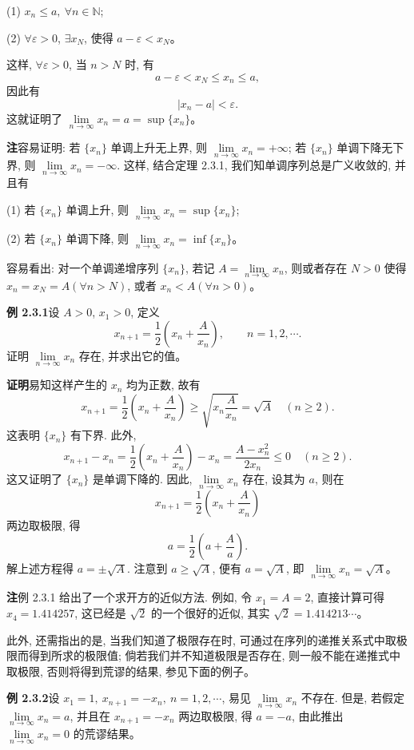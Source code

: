 \documentclass[UTF8, 12pt, fontset=fandol, oneside]{ctexart}
\begin{document}
(1) $x_n\leqslant a,\ \forall n\in\mathbb{N}$;

(2) $\forall\varepsilon>0$, $\exists x_N$, 使得 $a-\varepsilon<x_N$。

这样, $\forall\varepsilon>0$, 当 $n>N$ 时, 有
\[
  a-\varepsilon<x_N\leqslant x_n\leqslant a,
\]
因此有
\[
  |x_n-a|<\varepsilon.
\]
这就证明了 $\lim\limits_{n\to\infty}x_n=a=\sup\{x_n\}$。

\noindent\textbf{注}\quad 容易证明: 若 $\{x_n\}$ 单调上升无上界, 则 $\lim\limits_{n\to\infty}x_n=+\infty$; 若 $\{x_n\}$ 单调下降无下界, 则 $\lim\limits_{n\to\infty}x_n=-\infty$. 这样, 结合定理 2.3.1, 我们知单调序列总是广义收敛的, 并且有

(1) 若 $\{x_n\}$ 单调上升, 则 $\lim\limits_{n\to\infty}x_n=\sup\{x_n\}$;

(2) 若 $\{x_n\}$ 单调下降, 则 $\lim\limits_{n\to\infty}x_n=\inf\{x_n\}$。

容易看出: 对一个单调递增序列 $\{x_n\}$, 若记 $A=\lim\limits_{n\to\infty}x_n$, 则或者存在 $N>0$ 使得 $x_n=x_N=A(\forall n>N)$, 或者 $x_n<A(\forall n>0)$。

\noindent\textbf{例 2.3.1}\quad 设 $A>0$, $x_1>0$, 定义
\[
  x_{n+1}=\frac12\left(x_n+\frac A{x_n}\right),\qquad n=1,2,\cdots.
\]
证明 $\lim\limits_{n\to\infty}x_n$ 存在, 并求出它的值。

\noindent\textbf{证明}\quad 易知这样产生的 $x_n$ 均为正数, 故有
\[
  x_{n+1}=\frac12\left(x_n+\frac A{x_n}\right)
  \geqslant \sqrt{x_n\frac A{x_n}}=\sqrt A
  \quad(n\geqslant2).
\]
这表明 $\{x_n\}$ 有下界. 此外,
\[
  x_{n+1}-x_n
  =
  \frac12\left(x_n+\frac A{x_n}\right)-x_n
  =
  \frac{A-x_n^2}{2x_n}\leqslant0
  \quad(n\geqslant2).
\]
这又证明了 $\{x_n\}$ 是单调下降的. 因此, $\lim\limits_{n\to\infty}x_n$ 存在, 设其为 $a$, 则在
\[
  x_{n+1}=\frac12\left(x_n+\frac A{x_n}\right)
\]
两边取极限, 得
\[
  a=\frac12\left(a+\frac Aa\right).
\]
解上述方程得 $a=\pm\sqrt A$. 注意到 $a\geqslant\sqrt A$, 便有 $a=\sqrt A$, 即 $\lim\limits_{n\to\infty}x_n=\sqrt A$。

\noindent\textbf{注}\quad 例 2.3.1 给出了一个求开方的近似方法. 例如, 令 $x_1=A=2$, 直接计算可得 $x_4=1.414257$, 这已经是 $\sqrt2$ 的一个很好的近似, 其实 $\sqrt2=1.414213\cdots$。

此外, 还需指出的是, 当我们知道了极限存在时, 可通过在序列的递推关系式中取极限而得到所求的极限值; 倘若我们并不知道极限是否存在, 则一般不能在递推式中取极限, 否则将得到荒谬的结果, 参见下面的例子。

\noindent\textbf{例 2.3.2}\quad 设 $x_1=1,\ x_{n+1}=-x_n,\ n=1,2,\cdots$, 易见 $\lim\limits_{n\to\infty}x_n$ 不存在. 但是, 若假定 $\lim\limits_{n\to\infty}x_n=a$, 并且在 $x_{n+1}=-x_n$ 两边取极限, 得 $a=-a$, 由此推出 $\lim\limits_{n\to\infty}x_n=0$ 的荒谬结果。
\end{document}
